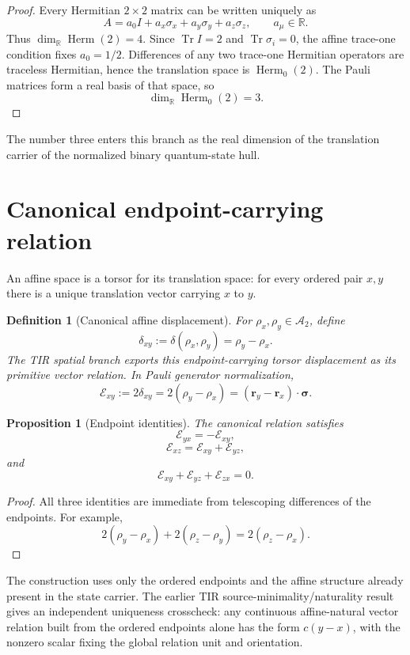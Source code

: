 \documentclass[12pt,a4paper]{article}
\newtheorem{proposition}[theorem]{Proposition}
\newtheorem{definition}[theorem]{Definition}
\newcommand{\Herm}{\operatorname{Herm}}
\newcommand{\Tr}{\operatorname{Tr}}
\newcommand{\R}{\mathbb{R}}
\newcommand{\Erel}{\mathcal{E}}
\newcommand{\Astate}{\mathcal{A}_2}
\newcommand{\sigmavec}{\bm{\sigma}}
\newcommand{\rvec}{\bm{r}}
\begin{document}
\begin{proof}
Every Hermitian $2\times2$ matrix can be written uniquely as
\[
A=a_0I+a_x\sigma_x+a_y\sigma_y+a_z\sigma_z,
\qquad a_\mu\in\R.
\]
Thus $\dim_{\R}\Herm(2)=4$. Since $\Tr I=2$ and $\Tr\sigma_i=0$, the affine trace-one condition fixes $a_0=1/2$. Differences of any two trace-one Hermitian operators are traceless Hermitian, hence the translation space is $\Herm_0(2)$. The Pauli matrices form a real basis of that space, so
\[
\boxed{\dim_{\R}\Herm_0(2)=3.}
\]
\end{proof}

The number three enters this branch as the real dimension of the translation carrier of the normalized binary quantum-state hull.

\section{Canonical endpoint-carrying relation}

An affine space is a torsor for its translation space: for every ordered pair $x,y$ there is a unique translation vector carrying $x$ to $y$.

\begin{definition}[Canonical affine displacement]
For $\rho_x,\rho_y\in\Astate$, define
\[
\boxed{\delta_{xy}:=\delta(\rho_x,\rho_y)=\rho_y-\rho_x.}
\]
The TIR spatial branch exports this endpoint-carrying torsor displacement as its primitive vector relation. In Pauli generator normalization,
\[
\boxed{
\Erel_{xy}:=2\delta_{xy}=2(\rho_y-\rho_x)
=(\rvec_y-\rvec_x)\cdot\sigmavec.
}
\]
\end{definition}

\begin{proposition}[Endpoint identities]\label{prop:endpoint}
The canonical relation satisfies
\[
\Erel_{yx}=-\Erel_{xy},
\]
\[
\boxed{\Erel_{xz}=\Erel_{xy}+\Erel_{yz},}
\]
and
\[
\boxed{\Erel_{xy}+\Erel_{yz}+\Erel_{zx}=0.}
\]
\end{proposition}

\begin{proof}
All three identities are immediate from telescoping differences of the endpoints. For example,
\[
2(\rho_y-\rho_x)+2(\rho_z-\rho_y)=2(\rho_z-\rho_x).
\]
\end{proof}

The construction uses only the ordered endpoints and the affine structure already present in the state carrier. The earlier TIR source-minimality/naturality result gives an independent uniqueness crosscheck: any continuous affine-natural vector relation built from the ordered endpoints alone has the form $c(y-x)$, with the nonzero scalar fixing the global relation unit and orientation.
\end{document}
